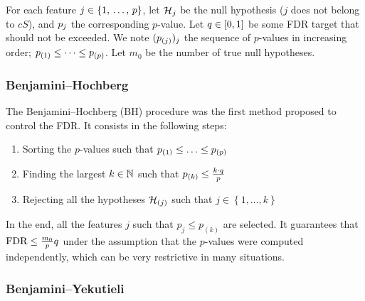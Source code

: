 For each feature $j \in \left\{ 1,\, \dots,\, p \right\}$, let $\mathcal{H}_j$ be the null hypothesis ($j$ does not belong to $cS$),
and $p_j$ the corresponding $p$-value.
Let $q \in [0, 1]$ be some FDR target that should not be exceeded.
We note $(p_{(j)})_j$ the sequence of $p$-values in increasing order;
$p_{(1)} \leq \dots \leq p_{(p)}$.
Let $m_0$ be the number of true null hypotheses.

\subsubsection{Benjamini–Hochberg}\label{subsubsec:bh}

The Benjamini–Hochberg (BH) procedure was the first method proposed to control the FDR\@.
It consists in the following steps:
\begin{enumerate}
    \item Sorting the $p$-values such that $p_{(1)} \leq \ldots \leq p_{(p)}$
    \item Finding the largest $k \in \mathbb{N}$ such that $p_{(k)} \leq \frac{k \cdot q}{p}$
    \item Rejecting all the hypotheses $\mathcal{H}_{(j)}$ such that $j \in \left\{ 1, \dots, k \right\}$
\end{enumerate}
In the end, all the features $j$ such that $p_j \leq p_{(k)}$ are selected.
It guarantees that $\text{FDR} \leq \frac{m_0}{p}q$ under the assumption that the $p$-values were computed
independently, which can be very restrictive in many situations.

\subsubsection{Benjamini–Yekutieli}\label{subsubsec:by}

